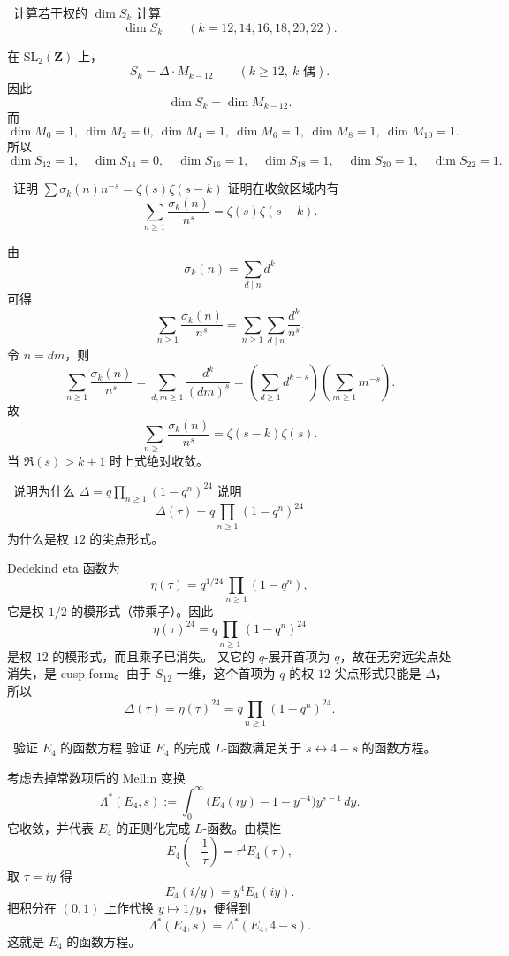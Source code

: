 \begin{problem}{\easy\ 计算若干权的 $\dim S_k$}
计算
\[
\dim S_k\qquad (k=12,14,16,18,20,22).
\]
\end{problem}
\begin{solution}
在 $\mathrm{SL}_2(\mathbf Z)$ 上，
\[
S_k=\Delta\cdot M_{k-12}\qquad (k\ge12,\ k\text{ 偶}).
\]
因此
\[
\dim S_k=\dim M_{k-12}.
\]
而
\[
\dim M_0=1,\ \dim M_2=0,\ \dim M_4=1,\ \dim M_6=1,\ \dim M_8=1,\ \dim M_{10}=1.
\]
所以
\[
\dim S_{12}=1,\quad
\dim S_{14}=0,\quad
\dim S_{16}=1,\quad
\dim S_{18}=1,\quad
\dim S_{20}=1,\quad
\dim S_{22}=1.
\]
\end{solution}

\begin{problem}{\easy\ 证明 $\sum \sigma_k(n)n^{-s}=\zeta(s)\zeta(s-k)$}
证明在收敛区域内有
\[
\sum_{n\ge1}\frac{\sigma_k(n)}{n^s}=\zeta(s)\zeta(s-k).
\]
\end{problem}
\begin{solution}
由
\[
\sigma_k(n)=\sum_{d\mid n}d^k
\]
可得
\[
\sum_{n\ge1}\frac{\sigma_k(n)}{n^s}
=
\sum_{n\ge1}\sum_{d\mid n}\frac{d^k}{n^s}.
\]
令 $n=dm$，则
\[
\sum_{n\ge1}\frac{\sigma_k(n)}{n^s}
=
\sum_{d,m\ge1}\frac{d^k}{(dm)^s}
=
\left(\sum_{d\ge1}d^{k-s}\right)\left(\sum_{m\ge1}m^{-s}\right).
\]
故
\[
\sum_{n\ge1}\frac{\sigma_k(n)}{n^s}
=
\zeta(s-k)\zeta(s).
\]
当 $\Re(s)>k+1$ 时上式绝对收敛。
\end{solution}

\begin{problem}{\easy\ 说明为什么 $\Delta=q\prod_{n\ge1}(1-q^n)^{24}$}
说明
\[
\Delta(\tau)=q\prod_{n\ge1}(1-q^n)^{24}
\]
为什么是权 $12$ 的尖点形式。
\end{problem}
\begin{solution}
Dedekind eta 函数为
\[
\eta(\tau)=q^{1/24}\prod_{n\ge1}(1-q^n),
\]
它是权 $1/2$ 的模形式（带乘子）。因此
\[
\eta(\tau)^{24}=q\prod_{n\ge1}(1-q^n)^{24}
\]
是权 $12$ 的模形式，而且乘子已消失。
又它的 $q$-展开首项为 $q$，故在无穷远尖点处消失，是 cusp form。由于 $S_{12}$ 一维，这个首项为 $q$ 的权 $12$ 尖点形式只能是 $\Delta$，所以
\[
\Delta(\tau)=\eta(\tau)^{24}=q\prod_{n\ge1}(1-q^n)^{24}.
\]
\end{solution}

\begin{problem}{\easy\ 验证 $E_4$ 的函数方程}
验证 $E_4$ 的完成 $L$-函数满足关于 $s\leftrightarrow 4-s$ 的函数方程。
\end{problem}
\begin{solution}
考虑去掉常数项后的 Mellin 变换
\[
\Lambda^\ast(E_4,s):=\int_0^\infty \bigl(E_4(iy)-1-y^{-4}\bigr)y^{s-1}\,dy.
\]
它收敛，并代表 $E_4$ 的正则化完成 $L$-函数。由模性
\[
E_4\!\left(-\frac1\tau\right)=\tau^4E_4(\tau),
\]
取 $\tau=iy$ 得
\[
E_4(i/y)=y^4E_4(iy).
\]
把积分在 $(0,1)$ 上作代换 $y\mapsto 1/y$，便得到
\[
\Lambda^\ast(E_4,s)=\Lambda^\ast(E_4,4-s).
\]
这就是 $E_4$ 的函数方程。
\end{solution}

